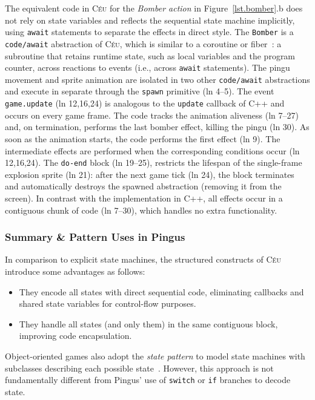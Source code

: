 \documentclass[times,twocolumn,final]{elsarticle}
\newcommand{\CEU}{\textsc{C\'{e}u}\xspace}
\newcommand{\code}[1] {{\small{\texttt{#1}}}}
\begin{document}
The equivalent code in \CEU for the \emph{Bomber action} in
Figure~\ref{lst.bomber}.b does not rely on state variables and reflects the
sequential state machine implicitly, using \code{await} statements to separate
the effects in direct style.
%
The \code{Bomber} is a \code{code/await} abstraction of \CEU, which is similar
to a coroutine or fiber~\cite{sync_async.cooperative}: a subroutine that
retains runtime state, such as local variables and the program counter, across
reactions to events (i.e., across \code{await} statements).
The pingu movement and sprite animation are isolated in two other
\code{code/await} abstractions and execute in separate through the \code{spawn}
primitive (ln 4--5).
The event \code{game.update} (ln 12,16,24) is analogous to the \code{update}
callback of C++ and occurs on every game frame.
%
The code tracks the animation aliveness (ln 7--27) and, on termination,
performs the last bomber effect, killing the pingu (ln 30).
As soon as the animation starts, the code performs the first effect (ln 9).
The intermediate effects are performed when the corresponding conditions occur
(ln 12,16,24).
The \code{do-end} block (ln 19--25), restricts the lifespan of the
single-frame explosion sprite (ln 21): after the next game tick (ln 24), the
block terminates and automatically destroys the spawned abstraction (removing
it from the screen).
%
In contrast with the implementation in C++, all effects occur in a contiguous
chunk of code (ln 7--30), which handles no extra functionality.

\subsubsection{Summary \& Pattern Uses in Pingus}

In comparison to explicit state machines, the structured constructs of \CEU
introduce some advantages as follows:
%
\begin{itemize}
\item They encode all states with direct sequential code, eliminating callbacks
      and shared state variables for control-flow purposes.
\item They handle all states (and only them) in the same contiguous block,
      improving code encapsulation.
\end{itemize}
%
Object-oriented games also adopt the \emph{state pattern} to model state
machines with subclasses describing each possible state~\cite{games.patterns}.
However, this approach is not fundamentally different from Pingus' use of
\code{switch} or \code{if} branches to decode state.
\end{document}
